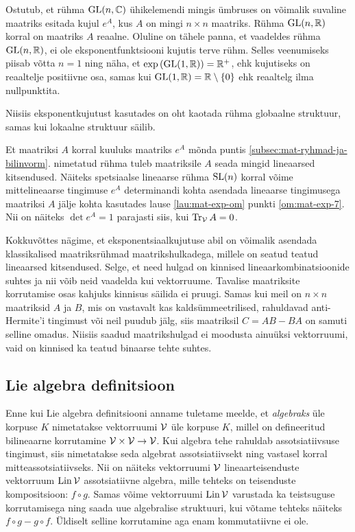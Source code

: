 Ostutub, et rühma $\operatorname{GL}(n, \mathbb{C})$ ühikelemendi mingis ümbruses on võimalik
suvaline maatriks esitada kujul $e^A$, kus $A$ on mingi $n \times n$
maatriks. Rühma $\operatorname{GL}(n, \mathbb{R})$ korral on maatriks $A$ reaalne. Oluline on
tähele panna, et vaadeldes rühma $\operatorname{GL}(n, \mathbb{R})$, ei ole eksponentfunktsiooni
kujutis terve rühm. Selles veenumiseks piisab võtta $n = 1$ ning näha, et
$\exp \left(\operatorname{GL}(1, \mathbb{R})\right) = \mathbb{R}^+$, ehk kujutiseks on reaaltelje positiivne
osa, samas kui $\operatorname{GL}(1, \mathbb{R}) = \mathbb{R} \setminus \{0\}$ ehk reaaltelg ilma
nullpunktita.

Niisiis eksponentkujutust kasutades on oht kaotada rühma globaalne struktuur,
samas kui lokaalne struktuur säilib.

Et maatriksi $A$ korral kuuluks maatriks $e^A$ mõnda puntis
\ref{subsec:mat-ryhmad-ja-bilinvorm}.  nimetatud rühma tuleb maatriksile
$A$ seada mingid lineaarsed kitsendused. Näiteks spetsiaalse lineaarse rühma
$\operatorname{SL}(n)$ korral võime mittelineaarse tingimuse $e^A$ determinandi kohta
asendada lineaarse tingimusega maatriksi $A$ jälje kohta kasutades lause
\ref{lau:mat-exp-om} punkti \ref{om:mat-exp-7}. Nii on näiteks
$\det e^A = 1$ parajasti siis, kui $\operatorname{Tr}_{\mathcal{V}} A = 0$.

Kokkuvõttes nägime, et eksponentsiaalkujutuse abil on võimalik asendada
klassikalised maatriksrühmad maatrikshulkadega, millele on seatud
teatud lineaarsed kitsendused. Selge, et need hulgad on kinnised
lineaarkombinatsioonide suhtes ja nii võib neid vaadelda kui vektorruume.
Tavalise maatriksite korrutamise osas kahjuks kinnisus säilida ei
pruugi. Samas kui meil on $n \times n$ maatriksid $A$ ja $B$, mis on vastavalt
kas kaldsümmeetrilised, rahuldavad anti-Hermite'i tingimust või neil
puudub jälg, siis maatriksil $C = AB - BA$ on samuti selline omadus.
Niisiis saadud maatrikshulgad ei moodusta ainuüksi vektorruumi,
vaid on kinnised ka teatud binaarse tehte suhtes.

\subsection{Lie algebra definitsioon}

Enne kui Lie algebra definitsiooni anname tuletame meelde, et \emph{algebraks}
üle korpuse $K$ nimetatakse vektorruumi $\mathcal{V}$ üle korpuse $K$, millel on
defineeritud bilineaarne korrutamine $\mathcal{V} \times \mathcal{V} \to \mathcal{V}$. Kui algebra
tehe rahuldab assotsiatiivsuse tingimust, siis nimetatakse seda algebrat
assotsiatiivsekt ning vastasel korral mitteassotsiatiivseks. Nii on näiteks
vektorruumi $\mathcal{V}$ lineaarteisenduste vektorruum $\operatorname{Lin} \mathcal{V}$ assotsiatiivne algebra,
mille tehteks on teisenduste kompositsioon: $f \circ g$. Samas võime
vektorruumi $\operatorname{Lin} \mathcal{V}$ varustada ka teistsuguse korrutamisega ning saada uue
algebralise struktuuri, kui võtame tehteks näiteks $f \circ g - g \circ f$.
Üldiselt selline korrutamine aga enam kommutatiivne ei ole.

